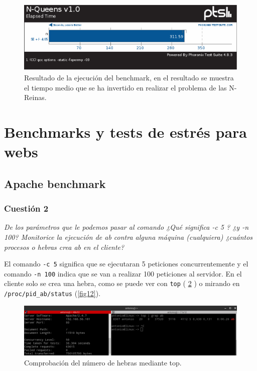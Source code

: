 \begin{figure}[H]
  \begin{center}
    \includegraphics[width=1\textwidth]{imagenes/pho5}
    \caption{Resultado de la ejecución del benchmark, en el resultado se muestra el tiempo medio que se ha invertido en realizar el problema de las N-Reinas.}
    \label{fig15}
  \end{center}
\end{figure}

\section{Benchmarks y tests de estrés para webs}
\subsection{Apache benchmark}

\subsubsection{Cuestión 2}
\textit{De los parámetros que le podemos pasar al comando ¿Qué significa -c 5 ? ¿y -n 100? Monitorice la ejecución de ab contra alguna máquina (cualquiera) ¿cuántos procesos o hebras crea ab en el cliente?}
\newline

El comando \texttt{-c 5} significa que se ejecutaran 5 peticiones concurrentemente y el comando \texttt{-n 100} indica que se van a realizar 100 peticiones al servidor.\cite{ab} En el cliente solo se crea una hebra, como se puede ver con \texttt{top} ( \cref{fig11} ) o mirando en \texttt{/proc/pid\_ab/status} (\cref{fig12}).

\begin{figure}[H]
  \begin{center}
    \includegraphics[width=1\textwidth]{imagenes/ab1}
    \caption{Comprobación del número de hebras mediante top.}
    \label{fig11}
  \end{center}
\end{figure}

